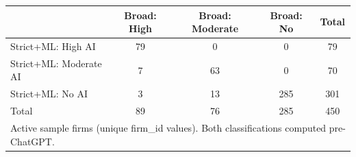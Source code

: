 \begin{tabular}{lccc|c}\hline\hline
 & Broad: High & Broad: Moderate & Broad: No & Total \\\hline
Strict+ML: High AI &   79 &    0 &    0 &   79 \\
Strict+ML: Moderate AI &    7 &   63 &    0 &   70 \\
Strict+ML: No AI &    3 &   13 &  285 &  301 \\\hline
Total &   89 &   76 &  285 &  450 \\\hline\hline
\multicolumn{5}{l}{\footnotesize Active sample firms (unique firm\_id values). Both classifications computed pre-ChatGPT.}
\end{tabular}
